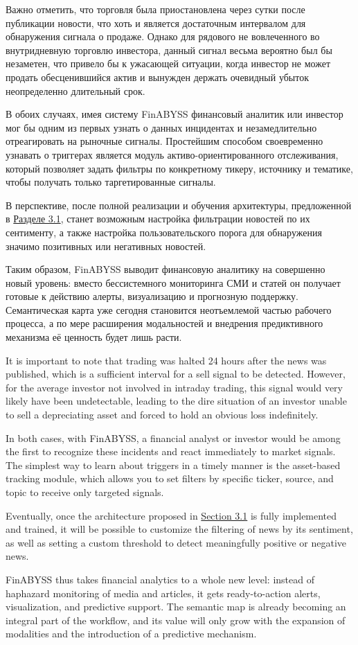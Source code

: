 Важно отметить, что торговля была приостановлена через сутки после публикации новости, что хоть
и является достаточным интервалом для обнаружения сигнала о продаже. Однако для рядового не вовлеченного
во внутридневную торговлю инвестора, данный сигнал весьма вероятно был бы незаметен, что привело бы
к ужасающей ситуации, когда инвестор не может продать обесценившийся актив и вынужден держать очевидный
убыток неопределенно длительный срок.

В обоих случаях, имея систему FinABYSS финансовый аналитик или инвестор мог бы одним из первых узнать
о данных инцидентах и незамедлительно отреагировать на рыночные сигналы. Простейшим способом своевременно
узнавать о триггерах является модуль активо-ориентированного отслеживания, который позволяет задать фильтры
по конкретному тикеру, источнику и тематике, чтобы получать только таргетированные сигналы.

В перспективе, после полной реализации и обучения архитектуры, предложенной в \hyperref[sec:architecture]{Разделе 3.1}, станет возможным
настройка фильтрации новостей по их сентименту, а также настройка пользовательского порога для обнаружения
значимо позитивных или негативных новостей.

Таким образом, FinABYSS выводит финансовую аналитику на совершенно новый уровень: вместо бессистемного
мониторинга СМИ и статей он получает готовые к действию алерты, визуализацию и прогнозную поддержку.
Семантическая карта уже сегодня становится неотъемлемой частью рабочего процесса, а по мере расширения
модальностей и внедрения предиктивного механизма её ценность будет лишь расти.


It is important to note that trading was halted 24 hours after the news was published, which is a sufficient
interval for a sell signal to be detected. However, for the average investor not involved in intraday trading,
this signal would very likely have been undetectable, leading to the dire situation of an investor unable to sell
a depreciating asset and forced to hold an obvious loss indefinitely.

In both cases, with FinABYSS, a financial analyst or investor would be among the first to recognize these incidents
and react immediately to market signals. The simplest way to learn about triggers in a timely manner is the asset-based
tracking module, which allows you to set filters by specific ticker, source, and topic to receive only targeted signals.

Eventually, once the architecture proposed in \hyperref[sec:architecture]{Section 3.1} is fully implemented and trained, it will be possible
to customize the filtering of news by its sentiment, as well as setting a custom threshold to detect meaningfully
positive or negative news.

FinABYSS thus takes financial analytics to a whole new level: instead of haphazard monitoring of media and articles,
it gets ready-to-action alerts, visualization, and predictive support. The semantic map is already becoming an integral
part of the workflow, and its value will only grow with the expansion of modalities and the introduction of a predictive
mechanism.